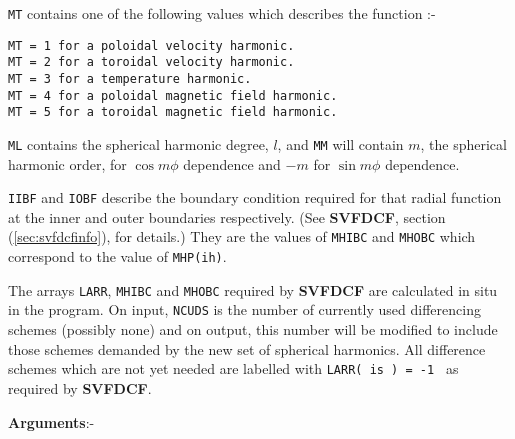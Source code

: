 \verb+MT+ contains one of the following values which describes
the function :-
\begin{verbatim}
MT = 1 for a poloidal velocity harmonic.
MT = 2 for a toroidal velocity harmonic.
MT = 3 for a temperature harmonic.
MT = 4 for a poloidal magnetic field harmonic.
MT = 5 for a toroidal magnetic field harmonic.
\end{verbatim}

\verb+ML+ contains the spherical harmonic degree, $l$, and
\verb+MM+ will contain $m$,
the spherical harmonic order, for $\cos m \phi$ dependence
and $-m$ for $\sin m \phi$ dependence.

\verb+IIBF+ and \verb+IOBF+ describe the boundary condition
required for that radial function at the inner and outer 
boundaries respectively. (See {\bf SVFDCF},
section (\ref{sec:svfdcfinfo}), for details.)
They are the values of \verb+MHIBC+ and \verb+MHOBC+ which
correspond to the value of \verb+MHP(ih)+.

The arrays \verb+LARR+, \verb+MHIBC+ and \verb+MHOBC+
required by {\bf SVFDCF} are calculated in situ in the
program. On input, \verb+NCUDS+ is the number of currently
used differencing schemes (possibly none) and on output,
this number will be modified to include those schemes
demanded by the new set of spherical harmonics.
All difference schemes which are not yet needed are
labelled with \verb+LARR( is ) = -1 + as required by
{\bf SVFDCF}.

\clearpage
{\bf Arguments}:- \newline

